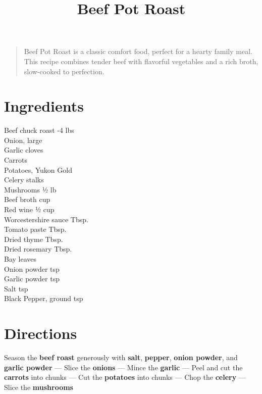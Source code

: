 \documentclass[11pt,letterpaper]{article}
\title{Beef Pot Roast}
\author{}
\date{}
\begin{document}
\maketitle
\thispagestyle{empty}

\begin{quote}
\small
\begin{em}
Beef Pot Roast is a classic comfort food, perfect for a hearty family meal. This recipe combines tender beef with flavorful vegetables and a rich broth, slow-cooked to perfection.
\end{em}
\end{quote}

\section*{Ingredients}
\setlength{\columnsep}{20pt}
\begin{multicols}{2}
\noindent
    Beef chuck roast -4 lbs \\
    Onion, large  \\
    Garlic cloves  \\
    Carrots  \\
    Potatoes, Yukon Gold  \\
    Celery stalks  \\
    Mushrooms \dotfill ½ lb \\
    \columnbreak
    Beef broth  cup \\
    Red wine \dotfill ½ cup \\
    Worcestershire sauce  Tbsp. \\
    Tomato paste  Tbsp. \\
    Dried thyme  Tbsp. \\
    Dried rosemary  Tbsp. \\
    Bay leaves  \\
    Onion powder  tsp \\
    Garlic powder  tsp \\
    Salt  tsp \\
    Black Pepper, ground  tsp
\end{multicols}

\section*{Directions}

\noindent
Season the \textbf{beef roast} generously with \textbf{salt}, \textbf{pepper}, \textbf{onion powder}, and \textbf{garlic powder} ---
Slice the \textbf{onions} ---
Mince the \textbf{garlic} ---
Peel and cut the \textbf{carrots} into chunks ---
Cut the \textbf{potatoes} into chunks ---
Chop the \textbf{celery} ---
Slice the \textbf{mushrooms}
\end{document}
